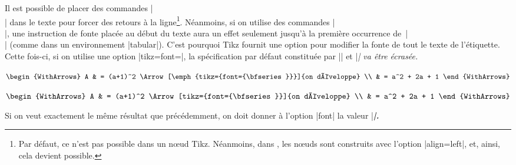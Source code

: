 \documentclass[dvipsnames]{article}%
\def\interitem{\vspace{7mm plus 2 mm minus 3mm}}
\begin{document}
\interitem 
Il est possible de placer des commandes |\\| dans le texte pour forcer des retours à la ligne\footnote{Par
défaut, ce n'est pas possible dans un nœud Tikz. Néanmoins, dans ,
les nœuds sont construits avec l'option |align=left|, et, ainsi, cela devient possible.}. Néanmoins, si on utilise des commandes |\\|, une instruction de fonte placée au début
du texte aura un effet seulement jusqu'à la première occurrence de~|\\| (comme
dans un environnement |{tabular}|). C'est pourquoi Tikz fournit une option
 pour modifier la fonte de tout le texte de l'étiquette. Cette fois-ci, si on
utilise une option |tikz={font={\bfseries}}|, la spécification par défaut constituée par
|\small| et |\itshape| va être écrasée. 
%
\begin{Code}
$\begin{WithArrows}
A & = (a+1)^2 \Arrow[\emph{tikz={font={\bfseries}}}]{on développe} \\
  & = a^2 + 2a + 1 
\end{WithArrows}$
\end{Code}

$\begin{WithArrows}
A & = (a+1)^2 \Arrow[tikz={font={\bfseries}}]{on développe} \\
  & = a^2 + 2a + 1 
\end{WithArrows}$

\medskip
Si on veut exactement le même résultat que précédemment, on doit donner à l'option |font|
la valeur |\itshape\small\bfseries|.
\end{document}
